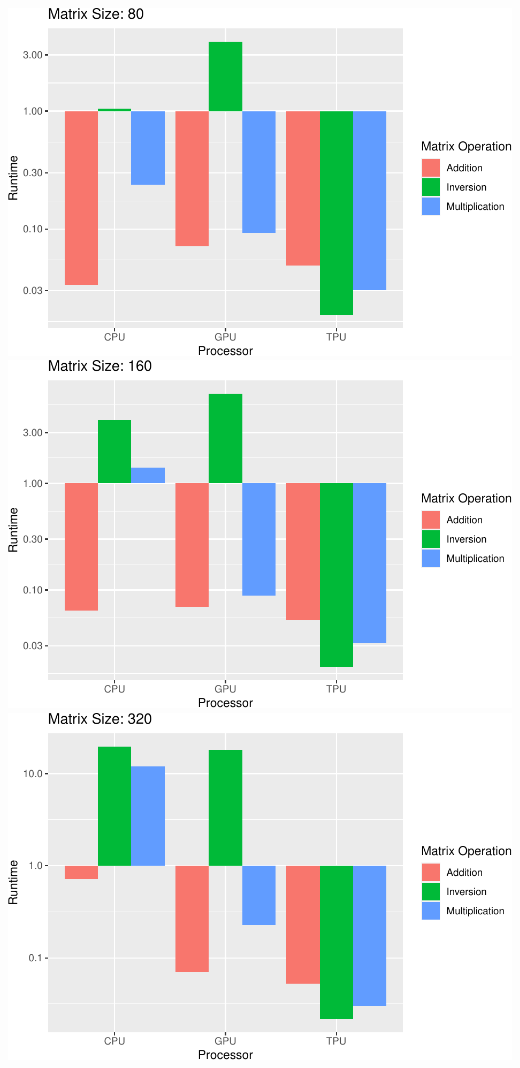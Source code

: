 \documentclass[
]{article}
\begin{document}
\includegraphics{main_files/figure-latex/unnamed-chunk-8-4.pdf}
\includegraphics{main_files/figure-latex/unnamed-chunk-8-5.pdf}
\includegraphics{main_files/figure-latex/unnamed-chunk-8-6.pdf}
\end{document}
